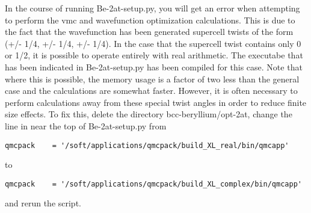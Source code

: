 In the course of running Be-2at-setup.py, you will get an error when attempting to perform the vmc and wavefunction optimization calculations.  This is due to the fact that the wavefunction has been generated supercell twists of the form (+/- 1/4, +/- 1/4, +/- 1/4).  In the case that the supercell twist contains only 0 or 1/2, it is possible to operate entirely with real arithmetic.  The executabe that has been indicated in Be-2at-setup.py has been compiled for this case.  Note that where this is possible, the memory usage is a factor of two less than the general case and the calculations are somewhat faster.  However, it is often necessary to perform calculations away from these special twist angles in order to reduce finite size effects.  To fix this, delete the directory bcc-beryllium/opt-2at, change the line in near the top of Be-2at-setup.py from 
\begin{shaded}
\begin{verbatim}
qmcpack    = '/soft/applications/qmcpack/build_XL_real/bin/qmcapp'
\end{verbatim}
\end{shaded}
to
\begin{shaded}
\begin{verbatim}
qmcpack    = '/soft/applications/qmcpack/build_XL_complex/bin/qmcapp'
\end{verbatim}
\end{shaded}
and rerun the script.

